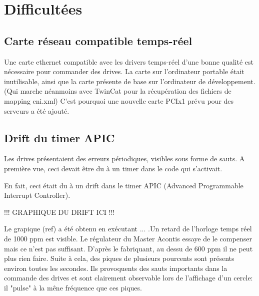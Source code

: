 \section{Difficultées}

\subsection{Carte réseau compatible temps-réel}
Une carte ethernet compatible avec les drivers temps-réel d'une bonne qualité est nécessaire pour commander des drives. La carte sur l'ordinateur portable était inutilisable, ainsi que la carte présente de base sur l'ordinateur de développement. (Qui marche néanmoins avec TwinCat pour la récupération des fichiers de mapping eni.xml) C'est pourquoi une nouvelle carte PCIx1 prévu pour des serveurs a été ajouté. 

\subsection{Drift du timer APIC}

Les drives présentaient des erreurs périodiques, visibles sous forme de sauts. A première vue, ceci devait être du à un timer dans le code qui s'activait.

\par
En fait, ceci était du à un drift dans le timer APIC (Advanced Programmable Interrupt Controller).

!!! GRAPHIQUE DU DRIFT ICI !!!

Le grapique (ref) a été obtenu en exécutant ... .Un retard de l'horloge temps réel de 1000 ppm est visible. Le régulateur du Master Acontis  essaye de le compenser mais ce n'est pas suffisant. D'après le fabriquant, au dessu de 600 ppm il ne peut plus rien faire. Suite à cela, des piques de plusieurs pourcents sont présents environ toutes les secondes. Ils provoquents des sauts importants dans la commande des drives et sont clairement observable lors de l'affichage d'un cercle: il "pulse" à la mêne fréquence que ces piques.